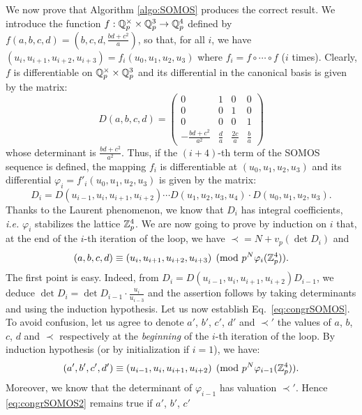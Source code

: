 \documentclass{lms}
\begin{document}
We now prove that Algorithm \ref{algo:SOMOS} produces the correct result.
We introduce the function $f : \mathbb Q_p^\times \times \mathbb Q_p^3 \to \mathbb Q_p^4$ defined by 
$f(a,b,c,d) = (b,c,d,\frac{bd+c^2}a)$, so that, for all $i$, we have 
$(u_i, u_{i+1}, u_{i+2}, u_{i+3}) = f_i(u_0, u_1, u_2, u_3)$ where $f_i
= f \circ \cdots \circ f$ ($i$ times). Clearly, $f$ is  
differentiable on $\mathbb Q_p^\times \times \mathbb Q_p^3$ and its differential in the 
canonical basis is given by the matrix:
$$D(a,b,c,d) = \begin{pmatrix}
0 & 1 & 0 & 0 \\
0 & 0 & 1 & 0 \\
0 & 0 & 0 & 1 \\
-\frac{bd+c^2}{a^2} & \frac d a & \frac {2c} a & \frac b a
\end{pmatrix}$$
whose determinant is $\frac{bd+c^2}{a^2}$. Thus, if the $(i+4)$-th term 
of the SOMOS sequence is defined, the mapping $f_i$ is differentiable
at $(u_0, u_1, u_2, u_3)$ and its differential $\varphi_i = 
f'_i(u_0, u_1, u_2, u_3)$ is given by the matrix:
$$D_i = D(u_{i-1}, u_i, u_{i+1}, u_{i+2}) \cdots
D(u_1, u_2, u_3, u_4) \cdot D(u_0, u_1, u_2, u_3).$$
Thanks to the Laurent phenomenon, we know that $D_i$ has
integral coefficients, \emph{i.e.} $\varphi_i$ stabilizes the lattice
$\mathbb Z_p^4$.
We are now going to prove by induction on $i$ that, at the end of the 
$i$-th iteration of the loop, we have $\prec = N + v_p(\det D_i)$ and
\begin{equation}
\label{eq:congrSOMOS}
(a, b, c, d) \equiv (u_i, u_{i+1}, u_{i+2}, u_{i+3}) \pmod
{p^N \varphi_i(\mathbb Z_p^4)}.
\end{equation}
The first point is easy. Indeed, from $D_i = D(u_{i-1}, u_i, u_{i+1}, 
u_{i+2}) D_{i-1}$, we deduce $\det D_i = \det D_{i-1} \cdot 
\frac{u_i}{u_{i-3}}$ and the assertion follows by taking determinants
and using the induction hypothesis. 
Let us now establish Eq.~\eqref{eq:congrSOMOS}. To avoid confusion, 
let us agree to denote $a'$, $b'$, $c'$, $d'$ and $\prec'$ the values of 
$a$, $b$, $c$, $d$ and $\prec$ respectively at the \emph{beginning} of 
the $i$-th iteration of the loop. By induction hypothesis (or by 
initialization if $i = 1$), we have:
\begin{equation}
\label{eq:congrSOMOS2}
(a', b', c', d') \equiv (u_{i-1}, u_i, u_{i+1}, u_{i+2}) \pmod
{p^N \varphi_{i-1}(\mathbb Z_p^4)}.
\end{equation}
Moreover, we know that the determinant of $\varphi_{i-1}$ has valuation
$\prec'$. Hence \eqref{eq:congrSOMOS2} remains true if $a'$, $b'$, $c'$
\end{document}
